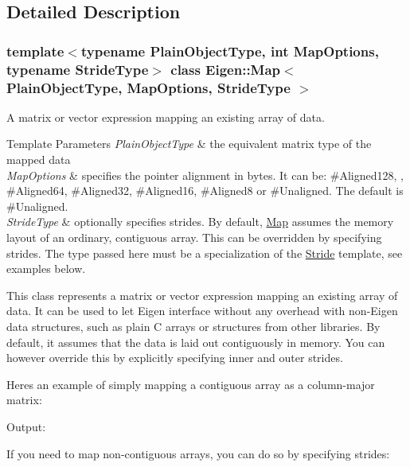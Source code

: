 \subsection{Detailed Description}
\subsubsection*{template$<$typename Plain\+Object\+Type, int Map\+Options, typename Stride\+Type$>$\newline
class Eigen\+::\+Map$<$ Plain\+Object\+Type, Map\+Options, Stride\+Type $>$}

A matrix or vector expression mapping an existing array of data. 


\begin{DoxyTemplParams}{Template Parameters}
{\em Plain\+Object\+Type} & the equivalent matrix type of the mapped data \\
\hline
{\em Map\+Options} & specifies the pointer alignment in bytes. It can be\+: {\ttfamily \#\+Aligned128}, , {\ttfamily \#\+Aligned64}, {\ttfamily \#\+Aligned32}, {\ttfamily \#\+Aligned16}, {\ttfamily \#\+Aligned8} or {\ttfamily \#\+Unaligned}. The default is {\ttfamily \#\+Unaligned}. \\
\hline
{\em Stride\+Type} & optionally specifies strides. By default, \mbox{\hyperlink{class_eigen_1_1_map}{Map}} assumes the memory layout of an ordinary, contiguous array. This can be overridden by specifying strides. The type passed here must be a specialization of the \mbox{\hyperlink{class_eigen_1_1_stride}{Stride}} template, see examples below.\\
\hline
\end{DoxyTemplParams}
This class represents a matrix or vector expression mapping an existing array of data. It can be used to let Eigen interface without any overhead with non-\/\+Eigen data structures, such as plain C arrays or structures from other libraries. By default, it assumes that the data is laid out contiguously in memory. You can however override this by explicitly specifying inner and outer strides.

Here\textquotesingle{}s an example of simply mapping a contiguous array as a column-\/major matrix\+: 
\begin{DoxyCodeInclude}{0}
\end{DoxyCodeInclude}
 Output\+: 
\begin{DoxyVerbInclude}
\end{DoxyVerbInclude}


If you need to map non-\/contiguous arrays, you can do so by specifying strides\+:

